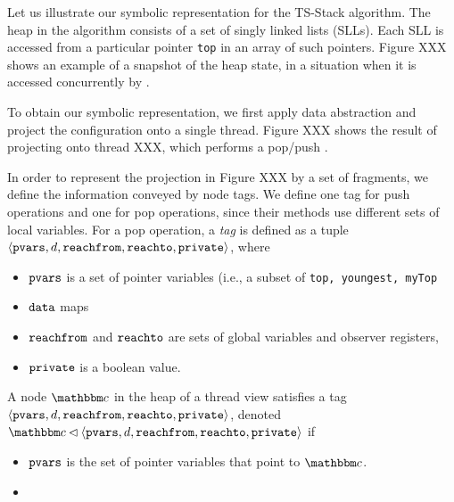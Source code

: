 Let us illustrate our symbolic representation for the TS-Stack algorithm.
The heap in the algorithm consists of a set of singly linked lists (SLLs). Each
SLL is accessed from a particular pointer {\tt top} in an array of such pointers.
Figure XXX shows an example of a snapshot of the heap state, in a situation when
it is accessed concurrently by
.

To obtain our symbolic representation, we first apply data abstraction and
project the configuration onto a single thread. Figure XXX shows the result
of projecting onto thread XXX, which performs a pop/push
.

In order to represent the projection in Figure XXX by
a set of fragments, we define the information conveyed by node tags.
We define one tag for push operations and one for pop operations, since
their methods use different sets of local variables.
For a pop operation, a {\em tag} is defined as a tuple
$\left\langle\mathtt{pvars},d,\mathtt{reachfrom},\mathtt{reachto},\mathtt{private}\right\rangle$, where
\begin{itemize}
\item
  $\mathtt{pvars}$ is a set of pointer variables (i.e., a subset of
  {\tt top, youngest, myTop}
\item
  $\mathtt{data}$ maps
\item
  $\mathtt{reachfrom}$ and $\mathtt{reachto}$ are sets of global variables and observer registers, 
\item
  $\mathtt{private}$ is a boolean value.
\end{itemize}
A node $\cell$ in the heap of a thread view satisfies a tag $\left\langle\mathtt{pvars},d,\mathtt{reachfrom},\mathtt{reachto},\mathtt{private}\right\rangle$,
denoted $\cell \lhd \tagtuple$ if
\begin{itemize}
\item
  $\mathtt{pvars}$ is the set of pointer variables that point to $\cell$.
\item
\end{itemize}

